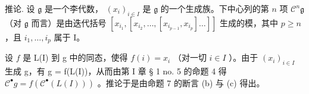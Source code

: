 推论. 设 \(\mathfrak{g}\) 是一个李代数， \((x_{i})_{i\in I}\) 是 \(\mathfrak{g}\) 的一个生成族。下中心列的第 \(n\) 项 \(\mathcal{C}^{n}\mathfrak{g}\) （对 \(\mathfrak{g}\) 而言）是由迭代括号 \([x_{i_1}, [x_{i_2}, \ldots, [x_{i_{p-1}}, x_{i_p}] \ldots]]\) 生成的模，其中 \(p \geqslant n\) ，且 \(i_1, \ldots, i_p\) 属于 I。

设 \(f\) 是 L(I) 到 g 中的同态，使得 \(f(i) = x_i\) （对一切 \(i \in I\) ）。由于 \((x_i)_{i \in I}\) 生成 g，有 g = f(L(I))，从而由第 I 章 § 1 no. 5 的命题 4 得 \(\mathcal{C}^{\bullet}g = f(\mathcal{C}^{\bullet}(L(I)))\) 。推论于是由命题 7 的断言 (b) 与 (c) 得出。

